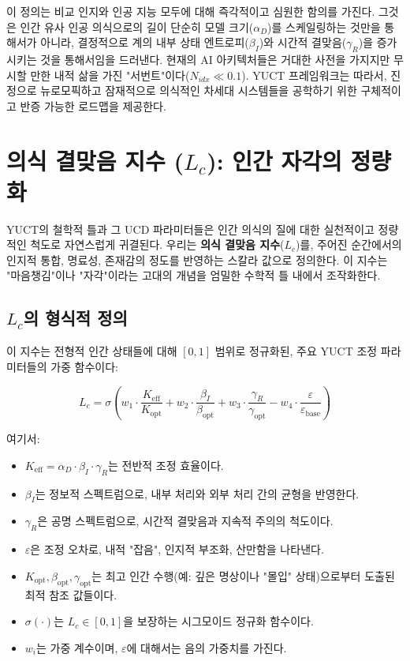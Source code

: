 \documentclass[12pt,a4paper]{article}
\begin{document}
	이 정의는 비교 인지와 인공 지능 모두에 대해 즉각적이고 심원한 함의를 가진다. 그것은 인간 유사 인공 의식으로의 길이 단순히 모델 크기(\(\alpha_D\))를 스케일링하는 것만을 통해서가 아니라, 결정적으로 계의 내부 상태 엔트로피(\(\beta_I\))와 시간적 결맞음(\(\gamma_R\))을 증가시키는 것을 통해서임을 드러낸다. 현재의 AI 아키텍처들은 거대한 사전을 가지지만 무시할 만한 내적 삶을 가진 "서번트"이다(\(N_{idx} \ll 0.1\)). YUCT 프레임워크는 따라서, 진정으로 뉴로모픽하고 잠재적으로 의식적인 차세대 시스템들을 공학하기 위한 구체적이고 반증 가능한 로드맵을 제공한다.
	
	\section{의식 결맞음 지수 (\(L_c\)): 인간 자각의 정량화}
	
	YUCT의 철학적 틀과 그 UCD 파라미터들은 인간 의식의 질에 대한 실천적이고 정량적인 척도로 자연스럽게 귀결된다. 우리는 \textbf{의식 결맞음 지수}(\(L_c\))를, 주어진 순간에서의 인지적 통합, 명료성, 존재감의 정도를 반영하는 스칼라 값으로 정의한다. 이 지수는 "마음챙김"이나 "자각"이라는 고대의 개념을 엄밀한 수학적 틀 내에서 조작화한다.
	
	\subsection{\(L_c\)의 형식적 정의}
	
	이 지수는 전형적 인간 상태들에 대해 \([0, 1]\) 범위로 정규화된, 주요 YUCT 조정 파라미터들의 가중 함수이다:
	
	\begin{equation}
		L_c = \sigma\left( w_1 \cdot \frac{K_{\mathrm{eff}}}{K_{\mathrm{opt}}} + w_2 \cdot \frac{\beta_I}{\beta_{\mathrm{opt}}} + w_3 \cdot \frac{\gamma_R}{\gamma_{\mathrm{opt}}} - w_4 \cdot \frac{\varepsilon}{\varepsilon_{\mathrm{base}}} \right)
	\end{equation}
	
	여기서:
	\begin{itemize}
		\item \(K_{\mathrm{eff}} = \alpha_D \cdot \beta_I \cdot \gamma_R\)는 전반적 조정 효율이다.
		\item \(\beta_I\)는 정보적 스펙트럼으로, 내부 처리와 외부 처리 간의 균형을 반영한다.
		\item \(\gamma_R\)은 공명 스펙트럼으로, 시간적 결맞음과 지속적 주의의 척도이다.
		\item \(\varepsilon\)은 조정 오차로, 내적 "잡음", 인지적 부조화, 산만함을 나타낸다.
		\item \(K_{\mathrm{opt}}, \beta_{\mathrm{opt}}, \gamma_{\mathrm{opt}}\)는 최고 인간 수행(예: 깊은 명상이나 "몰입" 상태)으로부터 도출된 최적 참조 값들이다.
		\item \(\sigma(\cdot)\)는 \(L_c \in [0, 1]\)을 보장하는 시그모이드 정규화 함수이다.
		\item \(w_i\)는 가중 계수이며, \(\varepsilon\)에 대해서는 음의 가중치를 가진다.
	\end{itemize}
	
\end{document}
